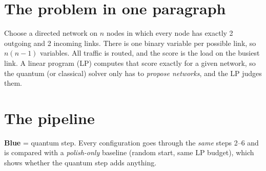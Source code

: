 \documentclass[11pt]{article}
\begin{document}
\section{The problem in one paragraph}
Choose a directed network on $n$ nodes in which every node has exactly 2 outgoing and 2 incoming
links. There is one binary variable per possible link, so $n(n-1)$ variables. All traffic is
routed, and the score is the load on the busiest link. A linear program (LP) computes that score
exactly for a given network, so the quantum (or classical) solver only has to \emph{propose
networks}, and the LP judges them.

\section{The pipeline}
\begin{center}
\end{center}
\noindent\textcolor{arc}{\textbf{Blue}} = quantum step. Every configuration goes through the
\emph{same} steps 2--6 and is compared with a \emph{polish-only} baseline (random start, same LP
budget), which shows whether the quantum step adds anything.
\end{document}

